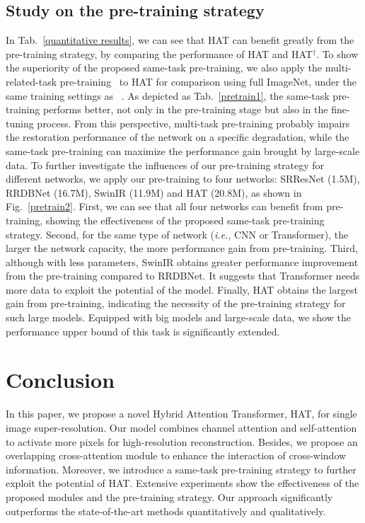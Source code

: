\documentclass[10pt,twocolumn,letterpaper]{article}
\begin{document}
\subsection{Study on the pre-training strategy}
\label{cmp_pretrain}
In Tab.~\ref{quantitative results}, we can see that HAT can benefit greatly from the pre-training strategy, by comparing the performance of HAT and {HAT}$^\dagger$. To show the superiority of the proposed same-task pre-training, we also apply the multi-related-task pre-training~\cite{edt} to HAT for comparison using full ImageNet, under the same training settings as ~\cite{edt}. As depicted as Tab.~\ref{pretrain1}, the same-task pre-training performs better, not only in the pre-training stage but also in the fine-tuning process. From this perspective, multi-task pre-training probably impairs the restoration performance of the network on a specific degradation, while the same-task pre-training can maximize the performance gain brought by large-scale data. To further investigate the influences of our pre-training strategy for different networks, we apply our pre-training to four networks: SRResNet (1.5M), RRDBNet (16.7M), SwinIR (11.9M) and HAT (20.8M), as shown in Fig.~\ref{pretrain2}. First, we can see that all four networks can benefit from pre-training, showing the effectiveness of the proposed same-task pre-training strategy. Second, for the same type of network (\textit{i.e.}, CNN or Transformer), the larger the network capacity, the more performance gain from pre-training. Third, although with less parameters, SwinIR obtains greater performance improvement from the pre-training compared to RRDBNet. It suggests that Transformer needs more data to exploit the potential of the model. Finally, HAT obtains the largest gain from pre-training, indicating the necessity of the pre-training strategy for such large models. Equipped with big models and large-scale data, we show the performance upper bound of this task is significantly extended.



\section{Conclusion}
In this paper, we propose a novel Hybrid Attention Transformer, HAT, for single image super-resolution. Our model combines channel attention and self-attention to activate more pixels for high-resolution reconstruction. Besides, we propose an overlapping cross-attention module to enhance the interaction of cross-window information. Moreover, we introduce a same-task pre-training strategy to further exploit the potential of HAT. Extensive experiments show the effectiveness of the proposed modules and the pre-training strategy. Our approach significantly outperforms the state-of-the-art methods quantitatively and qualitatively. 
\end{document}
